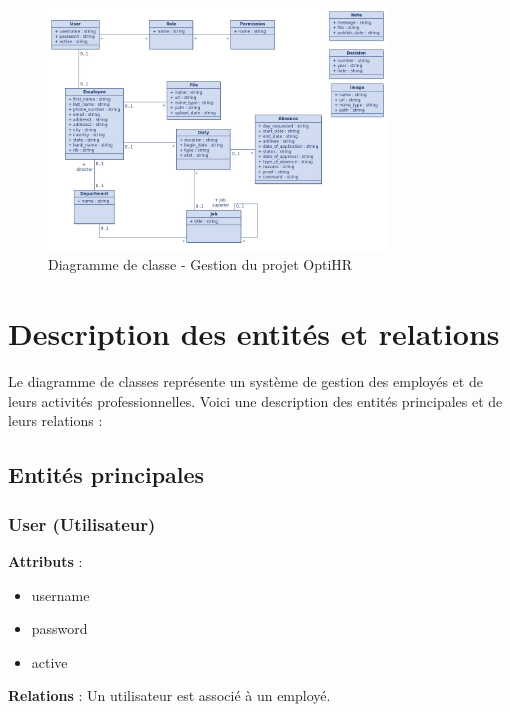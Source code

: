 \begin{figure}[H]
    \centering
    \includegraphics[width=0.8\textwidth]{images/diagrammes/class/diagramme.jpeg}
    \caption{Diagramme de classe - Gestion du projet OptiHR}
    \label{fig:class_diagramm_optiRH}
\end{figure}

\section{Description des entités et relations}

Le diagramme de classes représente un système de gestion des employés et de leurs activités professionnelles. Voici une description des entités principales et de leurs relations :

\subsection{Entités principales}

\subsubsection{User (Utilisateur)}
\textbf{Attributs} :
\begin{itemize}
    \item username
    \item password
    \item active
\end{itemize}
\textbf{Relations} : Un utilisateur est associé à un employé.


